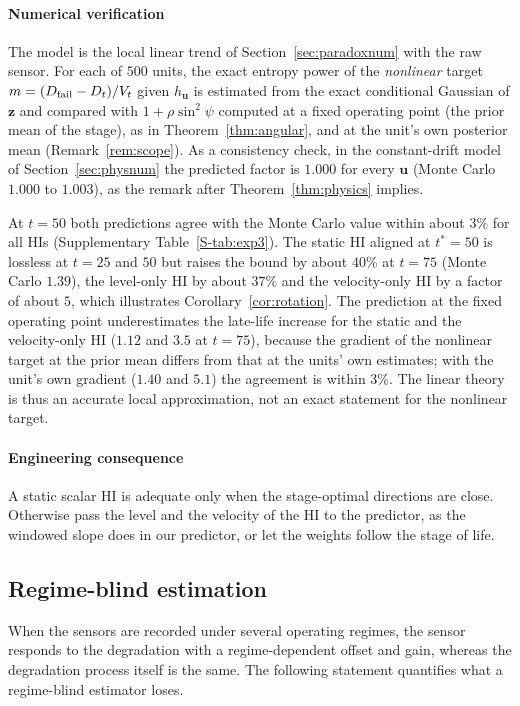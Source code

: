 \documentclass[preprint,12pt]{elsarticle}
\theoremstyle{definition}
\begin{document}
\paragraph{Numerical verification}
\label{sec:angnum}
The model is the local linear trend of Section~\ref{sec:paradoxnum} with the raw sensor. For each of $500$ units, the exact entropy power of the \emph{nonlinear} target $m=(D_{\rm fail}-D_t)/V_t$ given $h_{\mathbf u}$ is estimated from the exact conditional Gaussian of $\mathbf z$ and compared with $1+\rho\sin^2\psi$ computed at a fixed operating point (the prior mean of the stage), as in Theorem~\ref{thm:angular}, and at the unit's own posterior mean (Remark~\ref{rem:scope}). As a consistency check, in the constant-drift model of Section~\ref{sec:physnum} the predicted factor is $1.000$ for every $\mathbf u$ (Monte Carlo $1.000$ to $1.003$), as the remark after Theorem~\ref{thm:physics} implies.

At $t=50$ both predictions agree with the Monte Carlo value within about $3\%$ for all HIs (Supplementary Table~\ref{S-tab:exp3}). The static HI aligned at $t^\ast=50$ is lossless at $t=25$ and $50$ but raises the bound by about $40\%$ at $t=75$ (Monte Carlo $1.39$), the level-only HI by about $37\%$ and the velocity-only HI by a factor of about $5$, which illustrates Corollary~\ref{cor:rotation}. The prediction at the fixed operating point underestimates the late-life increase for the static and the velocity-only HI ($1.12$ and $3.5$ at $t=75$), because the gradient of the nonlinear target at the prior mean differs from that at the units' own estimates; with the unit's own gradient ($1.40$ and $5.1$) the agreement is within $3\%$. The linear theory is thus an accurate local approximation, not an exact statement for the nonlinear target.

\paragraph{Engineering consequence} A static scalar HI is adequate only when the stage-optimal directions are close. Otherwise pass the level and the velocity of the HI to the predictor, as the windowed slope does in our predictor, or let the weights follow the stage of life.

\subsection{Regime-blind estimation}
\label{sec:regimeleak}
When the sensors are recorded under several operating regimes, the sensor responds to the degradation with a regime-dependent offset and gain, whereas the degradation process itself is the same. The following statement quantifies what a regime-blind estimator loses.
\end{document}
